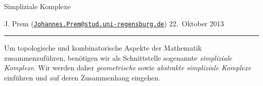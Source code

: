 %

\vspace*{-0.5cm}
\begin{center}
    \Large Simpliziale Komplexe
\end{center}

\medskip\noindent
J. Prem (\href{mailto:Johannes.Prem@stud.uni-regensburg.de}%
{\texttt{Johannes.Prem@stud.uni-regensburg.de}})
\hfill
22.~Oktober 2013
\\[-8pt]
\rule{\textwidth}{0.4pt}

\smallskip\noindent
%
Um topologische und kombinatorische Aspekte der Mathematik zusammenzuführen,
benötigen wir als Schnittstelle sogenannte \emph{simpliziale Komplexe}. Wir
werden daher \emph{geometrische} sowie \emph{abstrakte simpliziale Komplexe}
einführen und auf deren Zusammenhang eingehen.
